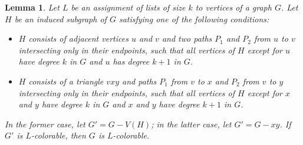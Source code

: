 \documentclass[12pt,twoside,openright,a4paper]{book}
\newtheorem{lemma}[theorem]{Lemma}
\begin{document}
\begin{lemma}\label{lemma-diamredu}
Let $L$ be an assignment of lists of size $k$ to vertices of a graph $G$.  Let $H$ be an induced subgraph of $G$ satisfying one of the following
conditions:
\begin{itemize}
\item[\textrm{(a)}] $H$ consists of adjacent vertices $u$ and $v$ and two paths $P_1$ and $P_2$ from $u$ to $v$ intersecting only in their
endpoints, such that all vertices of $H$ except for $u$ have degree $k$ in $G$ and $u$ has degree $k+1$ in $G$.
\item[\textrm{(b)}] $H$ consists of a triangle $vxy$ and paths $P_1$ from $v$ to $x$ and $P_2$ from $v$ to $y$ intersecting only in their
endpoints, such that all vertices of $H$ except for $x$ and $y$ have degree $k$ in $G$ and $x$ and $y$ have degree $k+1$ in $G$.
\end{itemize}
In the former case, let $G'=G-V(H)$; in the latter case, let $G'=G-xy$.  If $G'$ is $L$-colorable, then $G$ is $L$-colorable.
\end{lemma}
\end{document}
